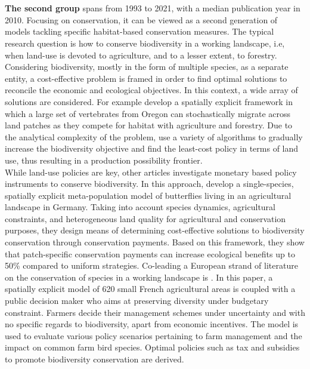 \\\\
\hspace*{1.5em}\textbf{The second group} spans from 1993 to 2021, with a median publication year in 2010. Focusing on conservation, it can be viewed as a second generation of models tackling specific habitat-based conservation measures. The typical research question is how to conserve biodiversity in a working landscape, i.e, when land-use is devoted to agriculture, and to a lesser extent, to forestry. Considering biodiversity, mostly in the form of multiple species, as a separate entity, a cost-effective problem is framed in order to find optimal solutions to reconcile the economic and ecological objectives. 
In this context, a wide array of solutions are considered. For example \cite{Polasky2005} develop a spatially explicit framework in which a large set of vertebrates from Oregon can stochastically migrate across land patches as they compete for habitat with agriculture and forestry.  Due to the analytical complexity of the problem, \cite{Polasky2005} use a variety of algorithms to gradually increase the biodiversity objective and find the least-cost policy in terms of land use, thus resulting in a production possibility frontier. \\
While land-use policies are key, other articles investigate monetary based policy instruments to conserve biodiversity. In this approach, \cite{DRECHSLER2007} develop a single-species, spatially explicit meta-population model of butterflies living in an agricultural landscape in Germany. Taking into account species dynamics, agricultural constraints, and heterogeneous land quality for agricultural and conservation purposes, they design means of determining cost-effective solutions to biodiversity conservation through conservation payments. Based on this framework, they show that patch-specific conservation payments can increase ecological benefits up to 50\% compared to uniform strategies.
Co-leading a European strand of literature on the conservation of species in a working landscape is \cite{MOUYSSET2012}. In this paper, a spatially explicit model of 620 small French agricultural areas is coupled with a public decision maker who aims at preserving diversity under budgetary constraint. Farmers decide their management schemes under uncertainty and with no specific regards to biodiversity, apart from economic incentives. The model is used to evaluate various policy scenarios pertaining to farm management and the impact on common farm bird species. Optimal policies such as tax and subsidies to promote biodiversity conservation are derived. 
